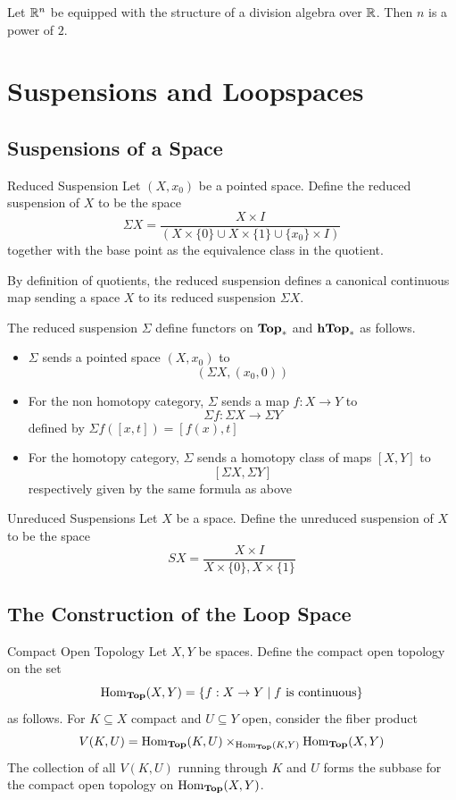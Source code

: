 \documentclass[a4paper]{article}
\begin{document}
\begin{prp}{}{} Let $\mathbb{R}^n$ be equipped with the structure of a division algebra over $\mathbb{R}$. Then $n$ is a power of $2$. 
\end{prp}

\pagebreak
\section{Suspensions and Loopspaces}
\subsection{Suspensions of a Space}
\begin{defn}{Reduced Suspension}{} Let $(X,x_0)$ be a pointed space. Define the reduced suspension of $X$ to be the space $$\Sigma X=\frac{X\times I}{(X\times\{0\}\cup X\times\{1\}\cup\{x_0\}\times I)}$$ together with the base point as the equivalence class in the quotient. 
\end{defn}

By definition of quotients, the reduced suspension defines a canonical continuous map sending a space $X$ to its reduced suspension $\Sigma X$. 

\begin{thm}{}{} The reduced suspension $\Sigma$ define functors on $\bold{Top}_\ast$ and $\bold{hTop}_\ast$ as follows. 
\begin{itemize}
\item $\Sigma$ sends a pointed space $(X,x_0)$ to $$(\Sigma X,(x_0,0))$$
\item For the non homotopy category, $\Sigma$ sends a map $f:X\to Y$ to $$\Sigma f:\Sigma X\to\Sigma Y$$ defined by $\Sigma f([x,t])=[f(x),t]$
\item For the homotopy category, $\Sigma$ sends a homotopy class of maps $[X,Y]$ to $$[\Sigma X,\Sigma Y]$$ respectively given by the same formula as above
\end{itemize}
\end{thm}

\begin{defn}{Unreduced Suspensions}{} Let $X$ be a space. Define the unreduced suspension of $X$ to be the space $$SX=\frac{X\times I}{X\times\{0\},X\times\{1\}}$$
\end{defn}

\subsection{The Construction of the Loop Space}
\begin{defn}{Compact Open Topology}{} Let $X,Y$ be spaces. Define the compact open topology on the set $$\operatorname{Hom}_\bold{Top}(X,Y)=\{f:X\to Y\;|\;f\text{ is continuous}\}$$ as follows. For $K\subseteq X$ compact and $U\subseteq Y$ open, consider the fiber product $$V(K,U)=\operatorname{Hom}_\bold{Top}(K,U)\times_{\operatorname{Hom}_\bold{Top}(K,Y)}\operatorname{Hom}_\bold{Top}(X,Y)$$ The collection of all $V(K,U)$ running through $K$ and $U$ forms the subbase for the compact open topology on $\operatorname{Hom}_\bold{Top}(X,Y)$. 
\end{defn}
\end{document}

